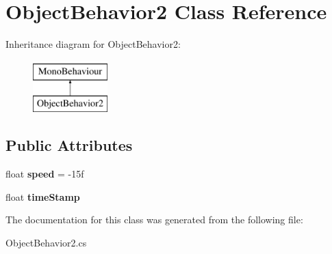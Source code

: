 \hypertarget{classObjectBehavior2}{\section{Object\-Behavior2 Class Reference}
\label{classObjectBehavior2}
}
Inheritance diagram for Object\-Behavior2\-:\begin{figure}[H]
\begin{center}
\leavevmode
\includegraphics[height=2.000000cm]{classObjectBehavior2}
\end{center}
\end{figure}
\subsection*{Public Attributes}
\begin{DoxyCompactItemize}
\item 
\hypertarget{classObjectBehavior2_a71c5a332d63c4fc276f53480f86f0641}{float {\bfseries speed} = -\/15f}\label{classObjectBehavior2_a71c5a332d63c4fc276f53480f86f0641}

\item 
\hypertarget{classObjectBehavior2_a00506f141025684b9ea62eea9040f347}{float {\bfseries time\-Stamp}}\label{classObjectBehavior2_a00506f141025684b9ea62eea9040f347}

\end{DoxyCompactItemize}


The documentation for this class was generated from the following file\-:\begin{DoxyCompactItemize}
\item 
Object\-Behavior2.\-cs\end{DoxyCompactItemize}
